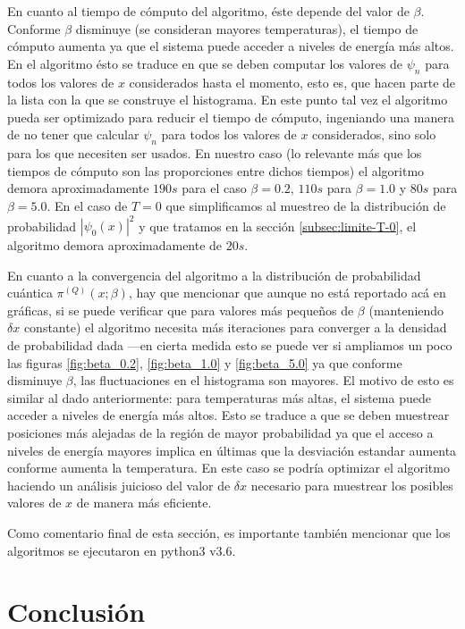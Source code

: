 \documentclass[%
 reprint,
 amsmath,amssymb,
 aps,
 pra,
]{revtex4-2}
\begin{document}
En cuanto al tiempo de cómputo del algoritmo, éste depende del valor de $\beta$. Conforme $\beta$ disminuye (se consideran mayores temperaturas), el tiempo de cómputo aumenta ya que el sistema puede acceder a niveles de energía más altos. En el algoritmo ésto se traduce en que se deben computar los valores de $\psi_n$ para todos los valores de $x$ considerados hasta el momento, esto es, que hacen parte de la lista con la que se construye el histograma. En este punto tal vez el algoritmo pueda ser optimizado para reducir el tiempo de cómputo, ingeniando una manera de no tener que calcular $\psi_n$ para todos los valores de $x$ considerados, sino solo para los que necesiten ser usados. En nuestro caso (lo relevante más que los tiempos de cómputo son las proporciones entre dichos tiempos) el algoritmo demora aproximadamente $190s$ para el caso $\beta = 0.2$, $110s$ para $\beta = 1.0$ y $80s$ para $\beta=5.0$. En el caso de $T=0$ que simplificamos al muestreo de la distribución de probabilidad $\left|\psi_0(x)\right|^2$ y que tratamos en la sección \ref{subsec:limite-T-0}, el algoritmo demora aproximadamente de $20s$.

En cuanto a la convergencia del algoritmo a la distribución de probabilidad cuántica $\pi^{(Q)}(x;\beta)$, hay que mencionar que aunque no está reportado acá en gráficas, si se puede verificar que para valores más pequeños de $\beta$ (manteniendo $\delta x$ constante) el algoritmo necesita más iteraciones para converger a la densidad de probabilidad dada —en cierta medida esto se puede ver si ampliamos un poco las figuras \ref{fig:beta_0.2}, \ref{fig:beta_1.0} y \ref{fig:beta_5.0} ya que conforme disminuye $\beta$, las fluctuaciones en el histograma son mayores. El motivo de esto es similar al dado anteriormente: para temperaturas más altas, el sistema puede acceder a niveles de energía más altos. Esto se traduce a que se deben muestrear posiciones más alejadas de la región de mayor probabilidad ya que el acceso a niveles de energía mayores implica en últimas que la desviación estandar aumenta conforme aumenta la temperatura. En este caso se podría optimizar el algoritmo haciendo un análisis juicioso del valor de $\delta x$ necesario para muestrear los posibles valores de $x$ de manera más eficiente.

Como comentario final de esta sección, es importante también mencionar que los algoritmos se ejecutaron en python3 v3.6.

\section{Conclusión\label{sec:conclusion}}
\end{document}
